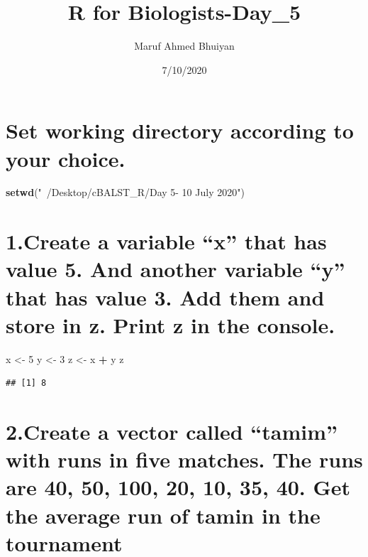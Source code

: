 \documentclass[]{article}
\title{R for Biologists-Day\_5}
\author{Maruf Ahmed Bhuiyan}
\date{7/10/2020}
\newenvironment{Shaded}{\begin{snugshade}}{\end{snugshade}}
\newcommand{\DecValTok}[1]{\textcolor[rgb]{0.00,0.00,0.81}{#1}}
\newcommand{\KeywordTok}[1]{\textcolor[rgb]{0.13,0.29,0.53}{\textbf{#1}}}
\newcommand{\NormalTok}[1]{#1}
\newcommand{\OperatorTok}[1]{\textcolor[rgb]{0.81,0.36,0.00}{\textbf{#1}}}
\newcommand{\StringTok}[1]{\textcolor[rgb]{0.31,0.60,0.02}{#1}}
\begin{document}
\maketitle

\hypertarget{set-working-directory-according-to-your-choice.}{%
\section{Set working directory according to your
choice.}\label{set-working-directory-according-to-your-choice.}}

\begin{Shaded}
\begin{Highlighting}[]
\KeywordTok{setwd}\NormalTok{(}\StringTok{"~/Desktop/cBALST_R/Day 5- 10 July 2020"}\NormalTok{)}
\end{Highlighting}
\end{Shaded}

\hypertarget{create-a-variable-x-that-has-value-5.-and-another-variable-y-that-has-value-3.-add-them-and-store-in-z.-print-z-in-the-console.}{%
\section{1.Create a variable ``x'' that has value 5. And another
variable ``y'' that has value 3. Add them and store in z. Print z in the
console.}\label{create-a-variable-x-that-has-value-5.-and-another-variable-y-that-has-value-3.-add-them-and-store-in-z.-print-z-in-the-console.}}

\begin{Shaded}
\begin{Highlighting}[]
\NormalTok{x <-}\StringTok{ }\DecValTok{5}
\NormalTok{y <-}\StringTok{ }\DecValTok{3}
\NormalTok{z <-}\StringTok{ }\NormalTok{x }\OperatorTok{+}\StringTok{ }\NormalTok{y}
\NormalTok{z}
\end{Highlighting}
\end{Shaded}

\begin{verbatim}
## [1] 8
\end{verbatim}

\hypertarget{create-a-vector-called-tamim-with-runs-in-five-matches.-the-runs-are-40-50-100-20-10-35-40.-get-the-average-run-of-tamin-in-the-tournament}{%
\section{2.Create a vector called ``tamim'' with runs in five matches.
The runs are 40, 50, 100, 20, 10, 35, 40. Get the average run of tamin
in the
tournament}\label{create-a-vector-called-tamim-with-runs-in-five-matches.-the-runs-are-40-50-100-20-10-35-40.-get-the-average-run-of-tamin-in-the-tournament}}
\end{document}
